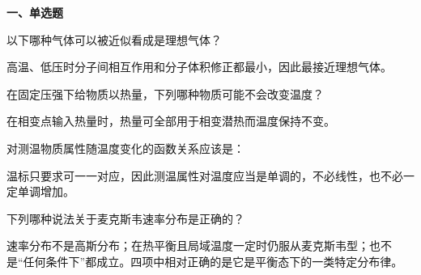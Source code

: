 ﻿

\textbf{一、单选题}
\begin{question}
以下哪种气体可以被近似看成是理想气体？
\begin{choiceoptions}
\end{choiceoptions}
\begin{solution}
高温、低压时分子间相互作用和分子体积修正都最小，因此最接近理想气体。
\end{solution}
\end{question}

\begin{question}
在固定压强下给物质以热量，下列哪种物质可能不会改变温度？
\begin{choiceoptions}
\end{choiceoptions}
\begin{solution}
在相变点输入热量时，热量可全部用于相变潜热而温度保持不变。
\end{solution}
\end{question}

\begin{question}
对测温物质属性随温度变化的函数关系应该是：
\begin{choiceoptions}
\end{choiceoptions}
\begin{solution}
温标只要求可一一对应，因此测温属性对温度应当是单调的，不必线性，也不必一定单调增加。
\end{solution}
\end{question}

\begin{question}
下列哪种说法关于麦克斯韦速率分布是正确的？
\begin{choiceoptions}
\end{choiceoptions}
\begin{solution}
速率分布不是高斯分布；在热平衡且局域温度一定时仍服从麦克斯韦型；也不是“任何条件下”都成立。四项中相对正确的是它是平衡态下的一类特定分布律。
\end{solution}
\end{question}

